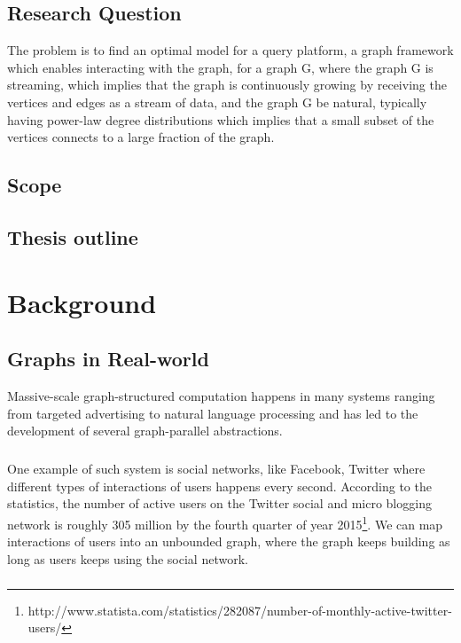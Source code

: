 \documentclass[12pt]{report}
\numberwithin{figure}{section}
\numberwithin{table}{section}
\begin{document}
\section{Research Question}
The problem is to find an optimal model for a query platform, a graph framework which enables interacting with the graph, for a graph G, where the graph G is streaming, which implies that the graph is continuously growing by receiving the vertices and edges as a stream of data, and the graph G be natural, typically having power-law degree distributions which implies that a small subset of the vertices connects to a large fraction of the graph.

\section{Scope}

\section{Thesis outline}

\chapter{Background}
\section{Graphs in Real-world}
Massive-scale graph-structured computation happens in many systems ranging from targeted advertising to natural language processing and has led to the development of several graph-parallel abstractions. 

\paragraph{}

One example of such system is social networks, like Facebook, Twitter where different types of interactions of users happens every second. According to the statistics, the number of active users on the Twitter social and micro blogging network is roughly 305 million by the fourth quarter of  year 2015\footnote{http://www.statista.com/statistics/282087/number-of-monthly-active-twitter-users/}. We can map interactions of users into an unbounded graph, where the graph keeps building as long as users keeps using the social network.

\paragraph{}
\end{document}
